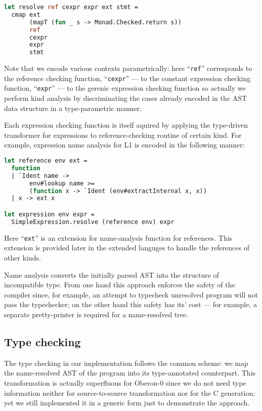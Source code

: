\begin{lstlisting}[language=ocaml]
let resolve ref cexpr expr ext stmt =
  cmap ext 
       (mapT (fun _ s -> Monad.Checked.return s)) 
       ref 
       cexpr 
       expr 
       stmt
\end{lstlisting}

Note that we encode various contexts parametrically: here ``\lstinline{ref}'' corresponds
to the reference checking function, ``\lstinline{cexpr}'' --- to the constant expression 
checking function, ``\lstinline{expr}'' --- to the gerenic expression checking function
so actually we perform kind analysis by discriminating the cases already encoded in
the AST data structure in a type-parametric manner. 

Each expression checking function is itself aquired by applying the type-driven transformer 
for expressions to reference-checking routine of certain kind. For example, expression 
name analysis for L1 is encoded in the following manner:

\begin{lstlisting}[language=ocaml]
let reference env ext = 
  function
  | `Ident name -> 
       env#lookup name >= 
       (function x -> `Ident (env#extractInternal x, x))
  | x -> ext x

let expression env expr = 
  SimpleExpression.resolve (reference env) expr 
\end{lstlisting}

Here ``\lstinline{ext}'' is an extension for name-analysis function for references. This 
extension is provided later in the extended languges to handle the references of other kinds.

Name analysis converts the initially parsed AST into the structure of incompatible 
type. From one hand this approach enforces the safety of the compiler since, for example, an attempt
to typecheck unresolved program will not pass the typechecker; on the other hand this
safety has its' cost --- for example, a separate pretty-printer is required for a
name-resolved tree. 

\subsection{Type checking}

The type checking in our implementation follows the common scheme: we map the name-resolved
AST of the program into its type-annotated counterpart. This transformation is
actually superfluous for Oberon-0 since we do not need type information neither for
source-to-source transformation nor for the C generation; yet we still implemented it in
a generic form just to demonstrate the approach.

